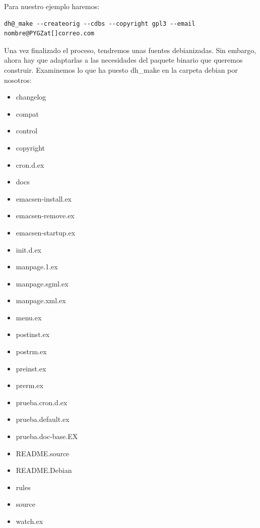 \documentclass[letterpaper,12pt,spanish]{manual}
\begin{document}
Para nuestro ejemplo haremos:

\begin{Verbatim}[commandchars=@\[\]]
dh@_make --createorig --cdbs --copyright gpl3 --email nombre@PYGZat[]correo.com
\end{Verbatim}

Una vez finalizado el proceso, tendremos unas fuentes debianizadas. Sin embargo, ahora hay que adaptarlas a las necesidades del paquete binario que queremos construir. Examinemos lo que ha puesto dh\_make en la carpeta debian por nosotros:
\begin{itemize}
\item {} 
changelog

\item {} 
compat

\item {} 
control

\item {} 
copyright

\item {} 
cron.d.ex

\item {} 
docs

\item {} 
emacsen-install.ex

\item {} 
emacsen-remove.ex

\item {} 
emacsen-startup.ex

\item {} 
init.d.ex

\item {} 
manpage.1.ex

\item {} 
manpage.sgml.ex

\item {} 
manpage.xml.ex

\item {} 
menu.ex

\item {} 
postinst.ex

\item {} 
postrm.ex

\item {} 
preinst.ex

\item {} 
prerm.ex

\item {} 
prueba.cron.d.ex

\item {} 
prueba.default.ex

\item {} 
prueba.doc-base.EX

\item {} 
README.source

\item {} 
README.Debian

\item {} 
rules

\item {} 
source

\item {} 
watch.ex

\end{itemize}
\end{document}
